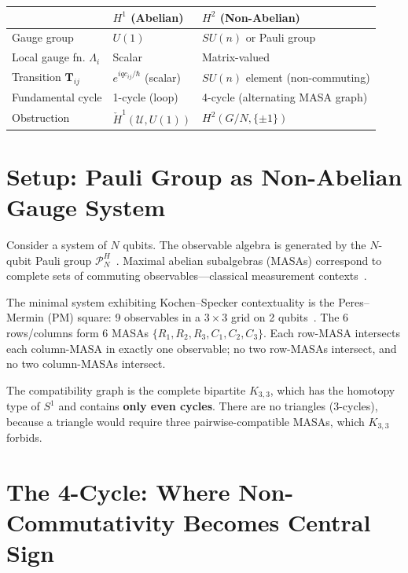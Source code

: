 \documentclass[11pt]{article}
\begin{document}
\begin{center}
\begin{tabular}{lll}
\toprule
& $H^1$ (Abelian) & $H^2$ (Non-Abelian) \\
\midrule
Gauge group & $U(1)$ & $SU(n)$ or Pauli group \\
Local gauge fn. $\Lambda_i$ & Scalar & Matrix-valued \\
Transition $\mathbf{T}_{ij}$ & $e^{iqc_{ij}/\hbar}$ (scalar) & $SU(n)$ element (non-commuting) \\
Fundamental cycle & 1-cycle (loop) & 4-cycle (alternating MASA graph) \\
Obstruction & $\check{H}^1(\mathcal{U}, U(1))$ & $H^2(G/N, \{\pm 1\})$ \\
\bottomrule
\end{tabular}
\end{center}

\section{Setup: Pauli Group as Non-Abelian Gauge System}
\label{sec:setup}

Consider a system of $N$ qubits. The observable algebra is generated by the
$N$-qubit Pauli group $\mathcal{P}_N^H$~\cite{PaperIII}. Maximal abelian subalgebras (MASAs)
correspond to complete sets of commuting observables---classical measurement
contexts~\cite{PaperI}.

The minimal system exhibiting Kochen--Specker contextuality is the Peres--Mermin
(PM) square: 9 observables in a $3\times3$ grid on 2 qubits~\cite{Peres90,Mermin90}.
The 6 rows/columns form 6 MASAs $\{R_1, R_2, R_3, C_1, C_2, C_3\}$. Each
row-MASA intersects each column-MASA in exactly one observable; no two row-MASAs
intersect, and no two column-MASAs intersect.

The compatibility graph is the complete bipartite $K_{3,3}$, which has the
homotopy type of $S^1$ and contains \textbf{only even cycles}. There are no
triangles (3-cycles), because a triangle would require three pairwise-compatible
MASAs, which $K_{3,3}$ forbids.

\section{The 4-Cycle: Where Non-Commutativity Becomes Central Sign}
\label{sec:4-cycle}
\end{document}
